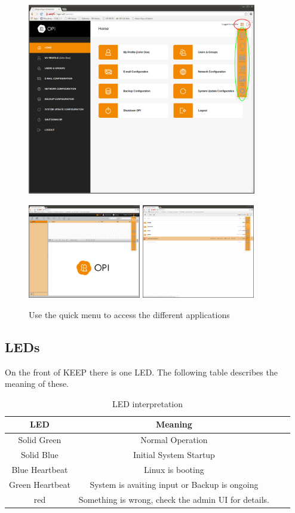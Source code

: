 \documentclass[12pt,a4paper,titlepage]{article}
\begin{document}
\begin{figure}[h!]
\centering
\includegraphics[width=10cm]{./img/menu-admin}

\includegraphics[width=4.93cm]{./img/menu-mail}
\includegraphics[width=4.93cm]{./img/menu-files}
\caption{Use the quick menu to access the different applications}
\end{figure}

\newpage
\subsection{LEDs}
On the front of KEEP there is one LED.
The following table describes the meaning of these.
\begin{table}[h!]
\centering
\renewcommand{\arraystretch}{1.5}
\renewcommand{\tabcolsep}{0.2cm}
\begin{tabular}{|c|c|c|l|}
\hline
\textbf{LED}&\textbf{Meaning} \\
\hline
Solid Green & Normal Operation \\
\hline
Solid Blue & Initial System Startup \\
\hline
Blue Heartbeat & Linux is booting\\
\hline
Green Heartbeat & System is avaiting input or Backup is ongoing \\
\hline
red & Something is wrong, check the admin UI for details. \\
\hline
\end{tabular}
\caption{LED interpretation}
\end{table}
\end{document}
